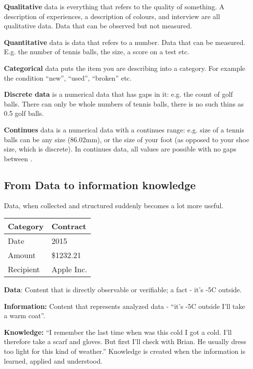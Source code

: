 \documentclass[letterpaper,10pt,oneside]{sphinxmanual}
\begin{document}
\textbf{Qualitative} data is everything that refers to the quality of something.
A description of experiences, a description of colours, and interview are all qualitative data.
Data that can be observed but not measured.

\textbf{Quantitative} data is data that refers to a number. Data that can be measured. E.g. the number of tennis balls, the size, a score on a test etc.

\textbf{Categorical} data puts the item you are describing into a category. For example the condition “new”, “used”, “broken” etc.

\textbf{Discrete data} is a numerical data that has gaps in it: e.g. the count of golf balls. There can only be whole numbers of tennis balls, there is no such thins as 0.5 golf balls.

\textbf{Continues} data is a numerical data with a continues range: e.g. size of a tennis balls can be any size (86.02mm), or the size of your foot (as opposed to your shoe size, which is discrete). In continues data, all values are possible with no gaps between .


\subsection{From Data to information knowledge}
\label{introduction:from-data-to-information-knowledge}
Data, when collected and structured suddenly becomes a lot more useful.

\begin{tabulary}{\linewidth}{|L|L|}
\hline
\textsf{\relax 
Category
} & \textsf{\relax 
Contract
}\\
\hline
Date
 & 
2015
\\
\hline
Amount
 & 
\$1232.21
\\
\hline
Recipient
 & 
Apple Inc.
\\
\hline\end{tabulary}


\textbf{Data}: Content that is directly observable or verifiable; a fact - it’s -5C outside.

\textbf{Information:} Content that represents analyzed data - “it’s -5C outside I’ll take a warm coat''.

\textbf{Knowledge:} “I remember the last time when was this cold I got a cold. I’ll therefore take a scarf and gloves.
But first I’ll check with Brian. He usually dress too light for this kind of weather.”
Knowledge is created when the information is learned, applied and understood.
\end{document}
